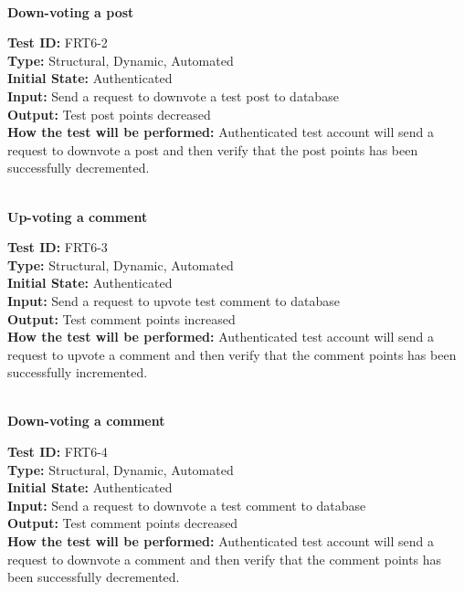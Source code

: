 \documentclass[12pt,fleqn]{article}
\begin{document}
\textbf{\\Down-voting a post}
\begin{tcolorbox}
\textbf{Test ID:} FRT6-2\\
\textbf{Type:} Structural, Dynamic, Automated\\
\textbf{Initial State:} Authenticated\\
\textbf{Input:} Send a request to downvote a test post to database\\
\textbf{Output:} Test post points decreased\\
\textbf{How the test will be performed:} Authenticated test account will send a request to downvote a post and then verify that the post points has been successfully decremented.
\end{tcolorbox}

\textbf{\\Up-voting a comment}
\begin{tcolorbox}
\textbf{Test ID:} FRT6-3\\
\textbf{Type:} Structural, Dynamic, Automated\\
\textbf{Initial State:} Authenticated\\
\textbf{Input:} Send a request to upvote test comment to database\\
\textbf{Output:} Test comment points increased\\
\textbf{How the test will be performed:} Authenticated test account will send a request to upvote a comment and then verify that the comment points has been successfully incremented.
\end{tcolorbox}

\textbf{\\Down-voting a comment}
\begin{tcolorbox}
\textbf{Test ID:} FRT6-4\\
\textbf{Type:} Structural, Dynamic, Automated\\
\textbf{Initial State:} Authenticated\\
\textbf{Input:} Send a request to downvote a test comment to database\\
\textbf{Output:} Test comment points decreased\\
\textbf{How the test will be performed:} Authenticated test account will send a request to downvote a comment and then verify that the comment points has been successfully decremented.
\end{tcolorbox}
\end{document}
